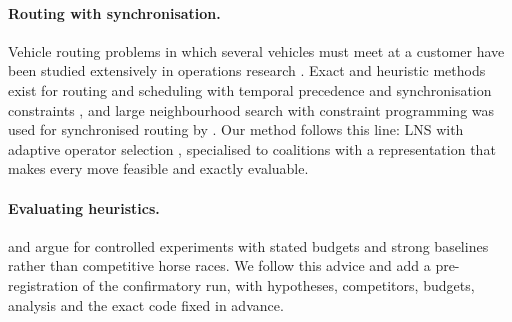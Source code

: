 \paragraph{Routing with synchronisation.} Vehicle routing problems in which several vehicles must meet at a
customer have been studied extensively in operations research \cite{drexl2012synchronization}. Exact and heuristic
methods exist for routing and scheduling with temporal precedence and synchronisation constraints
\cite{bredstrom2008combined,parragh2018solving}, and large neighbourhood search with constraint programming was used
for synchronised routing by \citet{hojabri2018large}. Our method follows this line: LNS \cite{shaw1998using} with
adaptive operator selection \cite{ropke2006adaptive,pisinger2010large}, specialised to coalitions with a
representation that makes every move feasible and exactly evaluable.

\paragraph{Evaluating heuristics.} \citet{hooker1995testing} and \citet{johnson2002theoreticians} argue for
controlled experiments with stated budgets and strong baselines rather than competitive horse races. We follow this
advice and add a pre-registration of the confirmatory run, with hypotheses, competitors, budgets, analysis and the
exact code fixed in advance.
